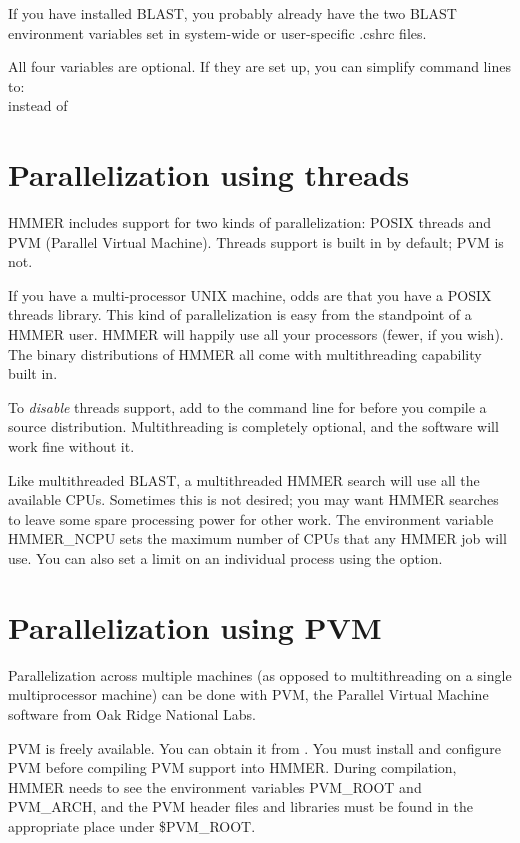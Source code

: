 If you have installed BLAST, you probably already have the two BLAST
environment variables set in system-wide or user-specific .cshrc
files. 

All four variables are optional. If they are set up, you can simplify
command lines to:\\
instead of\\

\section{Parallelization using threads}

HMMER includes support for two kinds of parallelization: POSIX threads
and PVM (Parallel Virtual Machine). Threads support is built in by
default; PVM is not.

If you have a multi-processor UNIX machine, odds are that you have a
POSIX threads library. This kind of parallelization is easy from the
standpoint of a HMMER user. HMMER will happily use all your processors
(fewer, if you wish). The binary distributions of HMMER all come with
multithreading capability built in.

To {\em disable} threads support, add  to the
command line for  before you compile a source
distribution. Multithreading is completely optional, and the software
will work fine without it.

Like multithreaded BLAST, a multithreaded HMMER search will use all
the available CPUs. Sometimes this is not desired; you may want HMMER
searches to leave some spare processing power for other work.  The
environment variable HMMER\_NCPU sets the maximum number of CPUs that
any HMMER job will use. You can also set a limit on an individual
process using the  option.

\section{Parallelization using PVM}

Parallelization across multiple machines (as opposed to multithreading
on a single multiprocessor machine) can be done with PVM, the Parallel
Virtual Machine software from Oak Ridge National Labs.

PVM is freely available. You can obtain it from
. You must install and configure PVM before
compiling PVM support into HMMER. During compilation, HMMER needs to
see the environment variables PVM\_ROOT and PVM\_ARCH, and the PVM
header files and libraries must be found in the appropriate place
under \$PVM\_ROOT.

